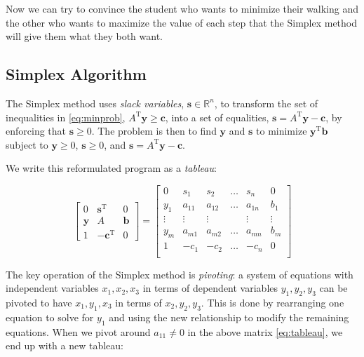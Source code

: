 \documentclass[12pt]{article}
\begin{document}
Now we can try to convince the student who wants to minimize their walking and the other who wants to maximize the value of each step that the Simplex method will give them what they both want.

\subsection{Simplex Algorithm}
The Simplex method uses \textit{slack variables}, $\mathbf{s} \in \mathbb{R}^n$, to transform the set of inequalities in \eqref{eq:minprob}, $A^{\text{T}} \mathbf{y} \geq \mathbf{c}$, into a set of equalities, $\mathbf{s} = A^{\text{T}} \mathbf{y} - \mathbf{c}$, by enforcing that $\mathbf{s} \geq 0$. The problem is then to find $\mathbf{y}$ and $\mathbf{s}$ to minimize $\mathbf{y}^\text{T}\mathbf{b}$ subject to $\mathbf{y}\geq 0$, $\mathbf{s}\geq 0$, and $\mathbf{s} = A^\text{T}\mathbf{y}-\mathbf{c}$.

We write this reformulated program as a \textit{tableau}:

\begin{equation} \label{eq:tableau}
\begin{bmatrix} 
0 & \mathbf{s}^\text{T} & 0 \\
\mathbf{y} & A & \mathbf{b} \\
1 & -\mathbf{c}^\text{T} & 0 
\end{bmatrix}
=
\begin{bmatrix} 
0 		& s_1 		& s_2		& \dots	& s_n & 0 \\
y_1		& a_{11}	& a_{12}	& \dots	& a_{1n} & b_1 \\
\vdots	&\vdots		&\vdots		&		& \vdots & \vdots \\
y_m		& a_{m1}	& a_{m2}	& \dots	& a_{mn} & b_m \\
1		& -c_1		& -c_2		& \dots	& -c_n	 & 0 \\
\end{bmatrix}
\end{equation}

The key operation of the Simplex method is \textit{pivoting}: a system of equations with independent variables $x_1, x_2, x_3$ in terms of dependent variables $y_1, y_2,y_3$ can be pivoted to have $x_1, y_1, x_3$ in terms of $x_2,y_2,y_3$. This is done by rearranging one equation to solve for $y_1$ and using the new relationship to modify the remaining equations. When we pivot around $a_{11} \neq 0$ in the above matrix \eqref{eq:tableau}, we end up with a new tableau:
\end{document}
